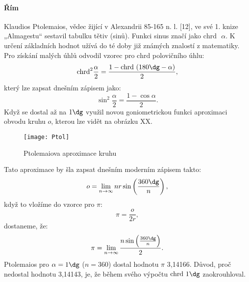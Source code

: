 \documentclass[rocnikovka]{gzwroc} %
\begin{document}
\paragraph{Řím}
Klaudios Ptolemaios, vědec žijící v Alexandrii 85-165 n. l. [12], ve své 1. knize „Almagestu“ sestavil tabulku tětiv (sinů). Funkci sinus značí jako $\mathrm{chrd} \textrm{ }\alpha$. K určení základních hodnot užívá do té doby již známých znalostí z matematiky. Pro získání malých úhlů odvodil vzorec pro $\mathrm{chrd}$ polovičního úhlu:
$$
\mathrm{chrd}^2\frac{\alpha}{2}=\frac{1-\mathrm{chrd}\textrm{ }(180\dg-\alpha)}{2},
$$
který lze zapsat dnešním zápisem jako:
$$
\sin^2\frac{\alpha}{2}=\frac{1-\cos\alpha}{2}.
$$
Když se dostal až na  $1\dg$ využil novou goniometrickou funkci aproximaci obvodu kruhu $o$, kterou lze vidět na obrázku XX.
\begin{figure}[!ht]
\texttt{[image: Ptol]}
\caption{Ptolemaiova aproximace kruhu}
\label{fig:kruh}
\end{figure}
Tato aproximace by šla zapsat dnešním moderním zápisem takto:
$$
o=\lim_{n\to\infty} nr\sin\left(\frac{360\dg}{n}\right),
$$
když to  vložíme do vzorce pro $\pi$:
$$
\pi=\frac{o}{2r},
$$
dostaneme, že:
\begin{equation}
\pi=\lim_{n\to\infty}\frac{n\sin\left(\frac{360\dg}{n}\right)}{2}.
\end{equation}
Ptolemaios pro $\alpha = 1\dg$ ($n=360$) dostal hodnotu $\pi$ 3,14166. Důvod, proč nedostal hodnotu 3,14143, je, že během svého výpočtu $\mathrm{chrd} \textrm{ }1\dg$ zaokrouhloval.
\end{document}
